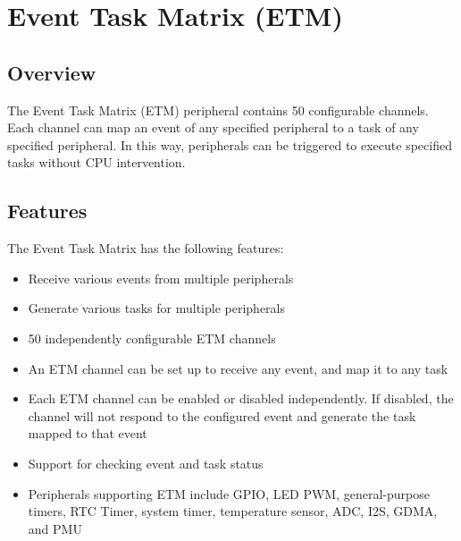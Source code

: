 \documentclass[main\_\_EN.tex]{subfiles}
\begin{document}

\ifglobal
\else
    \listoftodos
    {\let\clearpage\relax \listofdonetodos}
    \tableofcontents
\fi



\hypertarget{evntaskmatrix}{}
\chapter{Event Task Matrix (ETM)}
\label{mod:evntaskmatrix}


\section{Overview}
The Event Task Matrix (ETM) peripheral contains 50 configurable channels. Each channel can map an event of any specified peripheral to a task of any specified peripheral. In this way, peripherals can be triggered to execute specified tasks without CPU intervention.



\section{Features}
\label{sec:evntaskmatrix-features}

The Event Task Matrix has the following features:
\begin{itemize}
    \item Receive various events from multiple peripherals
    \item Generate various tasks for multiple peripherals
    \item 50 independently configurable ETM channels
    \item An ETM channel can be set up to receive any event, and map it to any task
    \item Each ETM channel can be enabled or disabled independently. If disabled, the channel will not respond to the configured event and generate the task mapped to that event
    \item Support for checking event and task status
    \item Peripherals supporting ETM include GPIO, LED PWM, general-purpose timers, RTC Timer, system timer, temperature sensor, ADC, I2S, GDMA, and PMU
\end{itemize}
\end{document}
